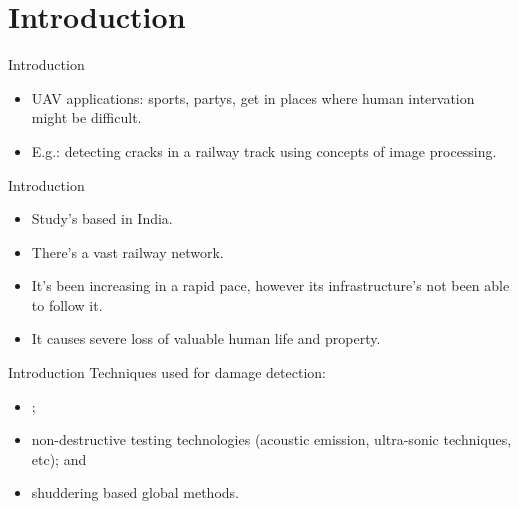 \section{Introduction}

\begin{frame}{Introduction}
    \begin{itemize}
        \item UAV applications: sports, partys, get in places where human intervation might be difficult.
        \item E.g.: detecting cracks in a railway track using concepts of image processing.
    \end{itemize}
\end{frame}


\begin{frame}{Introduction}
    \begin{itemize}
        \item Study's based in India.
        \item There's a vast railway network.
        \item It's been increasing in a rapid pace, however its infrastructure's not been able to follow it. 
        \item It causes  severe loss of valuable human life and property.
    \end{itemize}
\end{frame}


\begin{frame}{Introduction}
    Techniques used for damage detection:
    \begin{itemize}
        \item {};
        \item non-destructive testing technologies (acoustic emission, ultra-sonic techniques, etc); and
        \item shuddering based global methods. 
    \end{itemize}
\end{frame}


